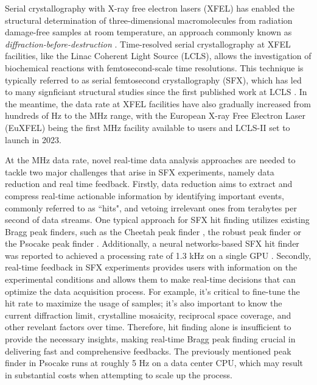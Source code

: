 \documentclass[conference]{IEEEtran}
\newcommand{\psocake}{Psocake}
\begin{document}
Serial crystallography with X-ray free electron lasers (XFEL) has enabled the
structural determination of three-dimensional macromolecules from radiation
damage-free samples at room temperature, an approach commonly known as
\textit{diffraction-before-destruction}
\citep{neutzePotentialBiomolecularImaging2000,
chapmanFemtosecondDiffractiveImaging2006,chapmanFemtosecondXrayProtein2011}.
Time-resolved serial crystallography at XFEL facilities, like the Linac Coherent
Light Source (LCLS), allows the investigation of biochemical reactions with
femtosecond-scale time resolutions.  This technique is typically referred to as
serial femtosecond crystallography (SFX), which has led to many signficiant
structural studies \citep{kupitzSerialTimeresolvedCrystallography2014,
nangoThreedimensionalMovieStructural2016,pandeFemtosecondStructuralDynamics2016a,
youngStructurePhotosystemII2016,sugaLightinducedStructuralChanges2017,
kernStructuresIntermediatesKok2018,ibrahimUntanglingSequenceEvents2020,
sugaTimeresolvedStudiesMetalloproteins2020} since the first published work at
LCLS \citep{aquilaTimeresolvedProteinNanocrystallography2012}.  In the meantime,
the data rate at XFEL facilities have also gradually increased from hundreds of
Hz to the MHz range, with the European X-ray Free Electron Laser (EuXFEL) being
the first MHz facility available to users and LCLS-II set to launch in 2023.

At the MHz data rate, novel real-time data analysis approaches are needed to
tackle two major challenges that arise in SFX experiments, namely data reduction
and real time feedback.  Firstly, data reduction aims to extract and compress
real-time actionable information by identifying important events, commonly
referred to as ``hits", and vetoing irrelevant ones from terabytes per second of
data streams.  One typical approach for SFX hit finding utilizes existing Bragg
peak finders, such as the Cheetah peak finder
\citep{bartyCheetahSoftwareHighthroughput2014}, the robust peak finder
\citep{hadian-jaziPeakfindingAlgorithmBased2017} or the \psocake{} peak finder
\citep{shinDataAnalysisUsing2018}.  Additionally, a neural networks-based SFX
hit finder was reported to achieved a processing rate of 1.3 kHz on a single GPU
\citep{keConvolutionalNeuralNetworkbased2018}.  Secondly, real-time feedback in
SFX experiments provides users with information on the experimental conditions
and allows them to make real-time decisions that can optimize the data
acquisition process.  For example, it's critical to fine-tune the hit rate to
maximize the usage of samples;  it's also important to know the current
diffraction limit, crystalline mosaicity, reciprocal space coverage, and other
revelant factors over time.  Therefore, hit finding alone is insufficient to
provide the necessary insights, making real-time Bragg peak finding crucial in
delivering fast and comprehensive feedbacks.  The previously mentioned peak
finder in \psocake{} runs at roughly 5 Hz on a data center CPU, which may result
in substantial costs when attempting to scale up the process.
\end{document}
